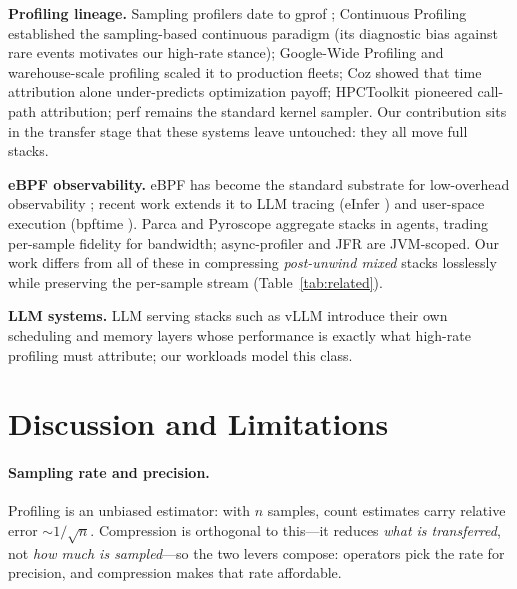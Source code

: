 \documentclass[letterpaper,twocolumn,10pt]{article}
\begin{document}
\textbf{Profiling lineage.} Sampling profilers date to gprof
\cite{gprof}; Continuous Profiling \cite{cpi} established the
sampling-based continuous paradigm (its diagnostic bias against rare
events motivates our high-rate stance); Google-Wide Profiling
\cite{gwp} and warehouse-scale profiling \cite{warehouse} scaled it to
production fleets; Coz \cite{coz} showed that time attribution alone
under-predicts optimization payoff; HPCToolkit \cite{hpctoolkit}
pioneered call-path attribution; perf \cite{perf} remains the standard
kernel sampler. Our contribution sits in the transfer stage that these
systems leave untouched: they all move full stacks.

\textbf{eBPF observability.} eBPF has become the standard substrate for
low-overhead observability \cite{ebpfcsur}; recent work extends it to
LLM tracing (eInfer \cite{einfer}) and user-space execution
(bpftime \cite{bpftime}). Parca \cite{parca} and Pyroscope
\cite{pyroscope} aggregate stacks in agents, trading per-sample fidelity
for bandwidth; async-profiler \cite{asyncprof} and JFR \cite{jfr}
are JVM-scoped. Our work differs from all of these in compressing
\emph{post-unwind mixed} stacks losslessly while preserving the
per-sample stream (Table~\ref{tab:related}).

\textbf{LLM systems.} LLM serving stacks such as vLLM \cite{vllm}
introduce their own scheduling and memory layers whose performance is
exactly what high-rate profiling must attribute; our workloads model this
class.

\section{Discussion and Limitations}
\paragraph{Sampling rate and precision.}
Profiling is an unbiased estimator: with $n$ samples, count estimates
carry relative error $\sim 1/\sqrt{n}$. Compression is orthogonal to
this---it reduces \emph{what is transferred}, not \emph{how much is
sampled}---so the two levers compose: operators pick the rate for
precision, and compression makes that rate affordable.
\end{document}
